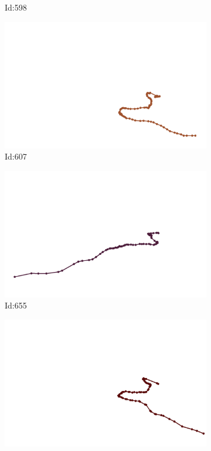 \documentclass[12pt,twoside]{report}
\begin{document}
\begin{figure}
\begin{subfigure}[b]{0.20\textwidth}
\caption{Id:598}
\end{subfigure}
\begin{subfigure}[b]{0.20\textwidth}
\centering
\includegraphics[width=\textwidth]{../trajectories/607.png}
\caption{Id:607}
\end{subfigure}
\begin{subfigure}[b]{0.20\textwidth}
\centering
\includegraphics[width=\textwidth]{../trajectories/655.png}
\caption{Id:655}
\end{subfigure}
\begin{subfigure}[b]{0.20\textwidth}
\centering
\includegraphics[width=\textwidth]{../trajectories/659.png}

\end{subfigure}
\end{figure}
\end{document}
